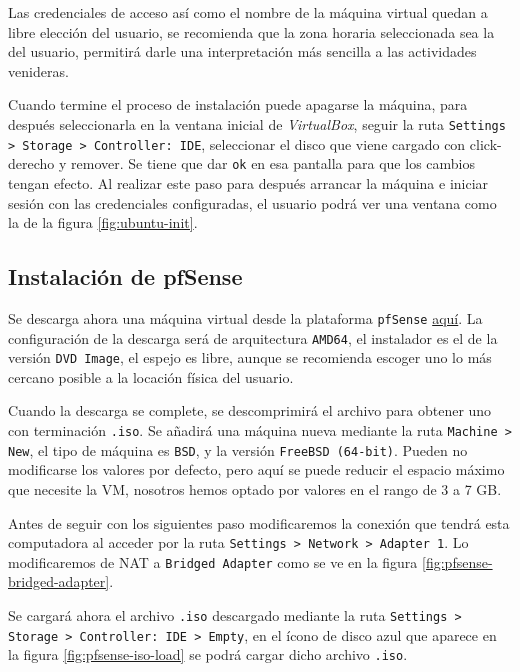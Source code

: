 \documentclass{article}
\begin{document}
            Las credenciales de acceso así como el nombre de la máquina virtual quedan a libre elección del usuario, se recomienda que la zona horaria seleccionada sea la del usuario, permitirá darle una interpretación más sencilla a las actividades venideras.

            Cuando termine el proceso de instalación puede apagarse la máquina, para después seleccionarla en la ventana inicial de \emph{VirtualBox}, seguir la ruta \texttt{Settings > Storage > Controller: IDE}, seleccionar el disco que viene cargado con click-derecho y remover. Se tiene que dar \texttt{ok} en esa pantalla para que los cambios tengan efecto. Al realizar este paso para después arrancar la máquina e iniciar sesión con las credenciales configuradas, el usuario podrá ver una ventana como la de la figura \ref{fig:ubuntu-init}.

        \subsection{Instalación de pfSense}
            
            Se descarga ahora una máquina virtual desde la plataforma \texttt{pfSense} \href{https://www.pfsense.org/download/#}{aquí}. La configuración de la descarga será de arquitectura \texttt{AMD64}, el instalador es el de la versión \texttt{DVD Image}, el espejo es libre, aunque se recomienda escoger uno lo más cercano posible a la locación física del usuario.

            Cuando la descarga se complete, se descomprimirá el archivo para obtener uno con terminación \texttt{.iso}. Se añadirá una máquina nueva mediante la ruta \texttt{Machine > New}, el tipo de máquina es \texttt{BSD}, y la versión \texttt{FreeBSD (64-bit)}. Pueden no modificarse los valores por defecto, pero aquí se puede reducir el espacio máximo que necesite la VM, nosotros hemos optado por valores en el rango de 3 a 7 GB.

            Antes de seguir con los siguientes paso modificaremos la conexión que tendrá esta computadora al acceder por la ruta \texttt{Settings > Network > Adapter 1}. Lo modificaremos de NAT a \texttt{Bridged Adapter} como se ve en la figura \ref{fig:pfsense-bridged-adapter}.

            Se cargará ahora el archivo \texttt{.iso} descargado mediante la ruta \texttt{Settings > Storage > Controller: IDE > Empty}, en el ícono de disco azul que aparece en la figura \ref{fig:pfsense-iso-load} se podrá cargar dicho archivo \texttt{.iso}.
\end{document}
